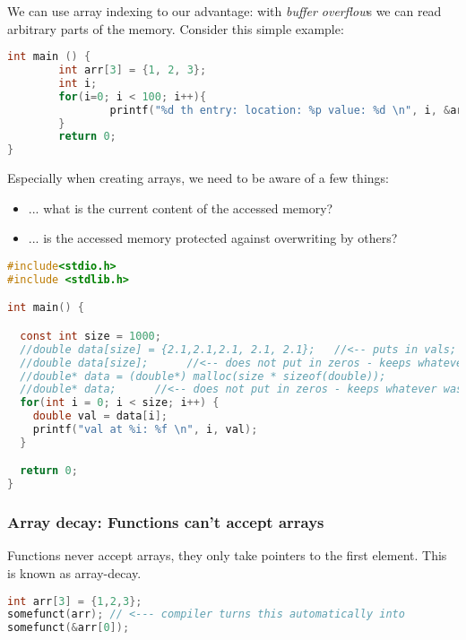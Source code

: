 We can use array indexing to our advantage: with \emph{buffer overflow}s we can read arbitrary parts of the memory. 
Consider this simple example:

\begin{lstlisting}[language=c]
   int main () {
        int arr[3] = {1, 2, 3};
        int i;
        for(i=0; i < 100; i++){
                printf("%d th entry: location: %p value: %d \n", i, &arr[i], arr[i]);
        }
        return 0;
} 
\end{lstlisting}

Especially when creating arrays, we need to be aware of a few things: 
\begin{itemize}
	\item ... what is the current content of the accessed memory?
	\item ... is the accessed memory protected against overwriting by others?
\end{itemize}

\begin{lstlisting}[language=c]
#include<stdio.h>
#include <stdlib.h>  

int main() {

  const int size = 1000;
  //double data[size] = {2.1,2.1,2.1, 2.1, 2.1};   //<-- puts in vals; fills rest with zeros. This mem won't be overwritten. 
  //double data[size];      //<-- does not put in zeros - keeps whatever was in there before. This mem won't be overwritten.
  //double* data = (double*) malloc(size * sizeof(double));              //<-- puts in zeros. This mem won't be overwritten.
  //double* data;      //<-- does not put in zeros - keeps whatever was in there before. This mem can be overwritten by others! 
  for(int i = 0; i < size; i++) {
    double val = data[i];
    printf("val at %i: %f \n", i, val);
  }

  return 0; 
}
\end{lstlisting}


\subsubsection{Array decay: Functions can't accept arrays}

Functions never accept arrays, they only take pointers to the first element. This is known as array-decay.

\begin{lstlisting}[language=c]
int arr[3] = {1,2,3};
somefunct(arr); // <--- compiler turns this automatically into 
somefunct(&arr[0]);
\end{lstlisting}


